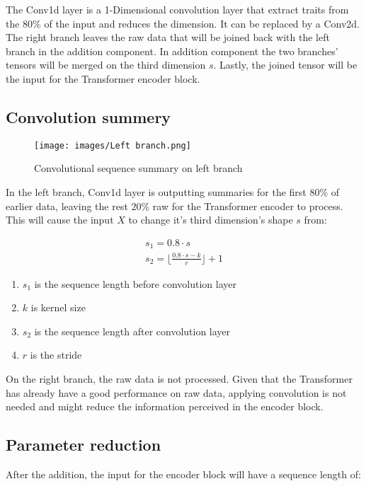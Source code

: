\documentclass[stu,12pt,floatsintext]{apa7}
\begin{document}
The Conv1d layer is a 1-Dimensional convolution layer that extract traits from the $80\%$ of the input and reduces the dimension. It can be replaced by a Conv2d. The right branch leaves the raw data that will be joined back with the left branch in the addition component. In addition component the two branches' tensors will be merged on the third dimension $s$. Lastly, the joined tensor will be the input for the Transformer encoder block. 

\subsection{Convolution summery}

\begin{figure}[H]
    \caption{Convolutional sequence summary on left branch}
    \centering
    \texttt{[image: images/Left branch.png]}
    \label{fig:convolutional-operation}
\end{figure}

In the left branch, Conv1d layer is outputting summaries for the first $80\%$ of earlier data, leaving the rest $20\%$ raw for the Transformer encoder to process. This will cause the input $X$ to change it's third dimension's shape $s$ from:

\begin{gather}
    s_1=0.8\cdot s\\
    s_2=\lfloor\frac{0.8\cdot s-k}{r} \rfloor+1
\end{gather}

\begin{enumerate}
    \item $s_1$ is the sequence length before convolution layer
    \item $k$ is kernel size
    \item $s_2$ is the sequence length after convolution layer
    \item $r$ is the stride
\end{enumerate}

On the right branch, the raw data is not processed. Given that the Transformer has already have a good performance on raw data, applying convolution is not needed and might reduce the information perceived in the encoder block. 

\subsection{Parameter reduction}

After the addition, the input for the encoder block will have a sequence length of:
\end{document}
